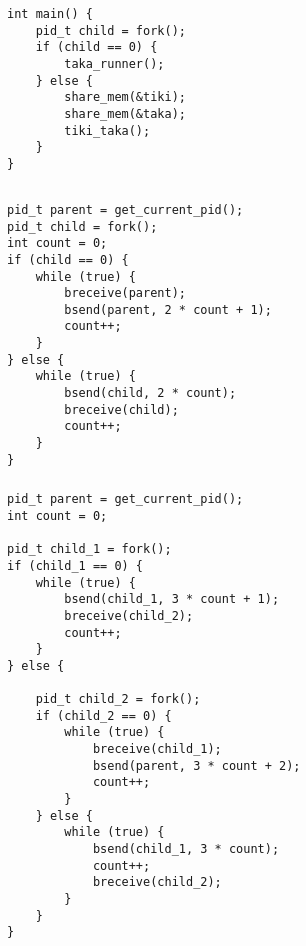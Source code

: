 \subsubsection{}

\begin{codesnippet}
\begin{verbatim}
int main() {
    pid_t child = fork();
    if (child == 0) {
        taka_runner();
    } else {
        share_mem(&tiki);
        share_mem(&taka);
        tiki_taka();
    }
}
\end{verbatim}
\end{codesnippet}

\subsection{}

\subsubsection{}

\begin{codesnippet}
\begin{verbatim}
pid_t parent = get_current_pid();
pid_t child = fork();
int count = 0;
if (child == 0) {
    while (true) {
        breceive(parent);
        bsend(parent, 2 * count + 1);
        count++;
    }
} else {
    while (true) {
        bsend(child, 2 * count);
        breceive(child);
        count++;
    }
}
\end{verbatim}
\end{codesnippet}

\subsubsection{}

\begin{codesnippet}
\begin{verbatim}
pid_t parent = get_current_pid();
int count = 0;

pid_t child_1 = fork();
if (child_1 == 0) {
    while (true) {
        bsend(child_1, 3 * count + 1);
        breceive(child_2);
        count++;
    }
} else {

    pid_t child_2 = fork();
    if (child_2 == 0) {
        while (true) {
            breceive(child_1);
            bsend(parent, 3 * count + 2);
            count++;
        }
    } else {
        while (true) {
            bsend(child_1, 3 * count);
            count++;
            breceive(child_2);
        }
    }
}
\end{verbatim}
\end{codesnippet}

